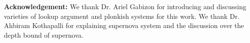 {\bf Acknowledgement:}
We thank Dr. Ariel Gabizon for introducing and discussing
varieties of lookup argument and plonkish systems
for this work. We thank Dr. Ahbiram Kothapalli for
explaining supernova system and the discussion over
the depth bound of supernova.
